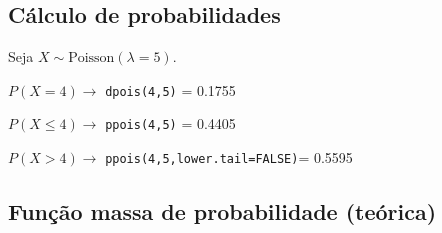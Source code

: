 \documentclass[
]{book}
\begin{document}
\subsection{Cálculo de probabilidades}\label{cuxe1lculo-de-probabilidades-2}

Seja \(X\sim\text{Poisson}(\lambda=5)\).

\(P(X =4) \to\) \texttt{dpois(4,5)} = 0.1755

\noindent \(P(X\leq 4) \to\) \texttt{ppois(4,5)} = 0.4405

\noindent \(P(X > 4)\to\) \texttt{ppois(4,5,lower.tail=FALSE)}= 0.5595

\subsection{Função massa de probabilidade (teórica)}\label{funuxe7uxe3o-massa-de-probabilidade-teuxf3rica-1}
\end{document}
